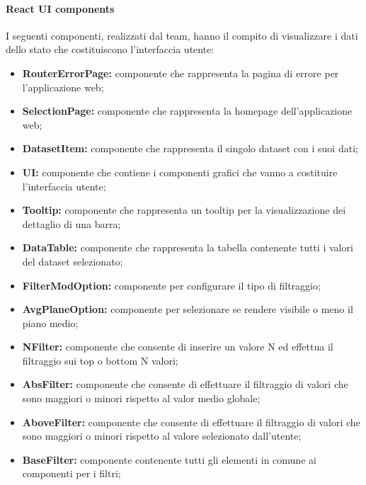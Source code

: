     \paragraph{React UI components}
        I seguenti componenti, realizzati dal team, hanno il compito di visualizzare i dati dello stato che costituiscono l’interfaccia
        utente:
        \begin{itemize}
            \item \textbf{RouterErrorPage:} componente che rappresenta la pagina di errore per l'applicazione web;
            \item \textbf{SelectionPage:} componente che rappresenta la homepage dell'applicazione web;
            \item \textbf{DatasetItem:} componente che rappresenta il singolo dataset con i suoi dati;
            \item \textbf{UI:} componente che contiene i componenti grafici che vanno a costituire l’interfaccia utente;
            \item \textbf{Tooltip:} componente che rappresenta un tooltip per la visualizzazione dei dettaglio di una barra;
            \item \textbf{DataTable:} componente che rappresenta la tabella contenente tutti i valori del dataset selezionato;
            \item \textbf{FilterModOption:} componente per configurare il tipo di filtraggio;
            \item \textbf{AvgPlaneOption:} componente per selezionare se rendere visibile o meno il piano medio;
            \item \textbf{NFilter:} componente che consente di inserire un valore N ed effettua il filtraggio sui top o bottom N valori;
            \item \textbf{AbsFilter:} componente che consente di effettuare il filtraggio di valori che sono maggiori o minori rispetto al valor medio globale;
            \item \textbf{AboveFilter:} componente che consente di effettuare il filtraggio di valori che sono maggiori o minori rispetto al valore selezionato dall'utente;
            \item \textbf{BaseFilter:} componente contenente tutti gli elementi in comune ai componenti per i filtri;
        \end{itemize}
